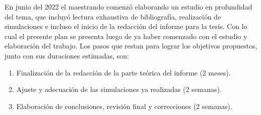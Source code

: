 \documentclass[a4paper, twoside, 11pt, spanish]{article}
\begin{document}
En junio del 2022 el maestrando comenzó elaborando un estudio en profundidad del
tema, que incluyó lectura exhaustiva de bibliografía, realización de
simulaciones e incluso el inicio de la redacción del informe para la tesis. Con
lo cual el presente plan se presenta luego de ya haber comenzado con el estudio
y elaboración del trabajo. Los pasos que restan para lograr los objetivos
propuestos, junto con sus duraciones estimadas, son:

\begin{enumerate}
  \item Finalización de la redacción de la parte teórica del informe (2 meses).
  \item Ajuste y adecuación de las simulaciones ya realizadas (2 semanas).
  \item Elaboración de conclusiones, revisión final y correcciones (2 semanas).
\end{enumerate}

\bigskip


\end{document}
